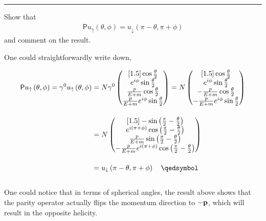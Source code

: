 \noindent\rule{7in}{1.5pt}


\begin{problem}{4.13} 
Show that
\begin{align*}
     \mathsf{P} u_\uparrow \left( \theta,\phi \right) = u_\downarrow \left( \pi-\theta,\pi+\phi \right)
\end{align*}
and comment on the result.
\end{problem}
\begin{solution}
One could straightforwardly write down,

\begin{align*}
    \mathsf{P}u_\uparrow\left(\theta,\phi\right) = \gamma^0 u_\uparrow\left(\theta,\phi\right) &= N \gamma^0 \begin{pmatrix}[1.5] 
        \cos \frac{\theta}{2} \\
        e^{i\phi} \sin \frac{\theta}{2} \\
        \frac{p}{E+m} \cos \frac{\theta}{2} \\
        \frac{p}{E+m} e^{i\phi} \sin \frac{\theta}{2} \\
    \end{pmatrix} = N  \begin{pmatrix}[1.5] 
        \cos \frac{\theta}{2} \\
        e^{i\phi} \sin \frac{\theta}{2} \\
        -\frac{p}{E+m} \cos \frac{\theta}{2} \\
        -\frac{p}{E+m} e^{i\phi} \sin \frac{\theta}{2} \\
    \end{pmatrix} \\[0.15in]
    &= N  \begin{pmatrix}[1.5] 
        - \sin \left(\frac{\pi}{2} - \frac{\theta}{2}\right) \\
        e^{i(\pi+\phi)} \cos \left(\frac{\pi}{2} - \frac{\theta}{2}\right) \\
         \frac{p}{E+m} \sin \left(\frac{\pi}{2} - \frac{\theta}{2}\right) \\
        -\frac{p}{E+m} e^{i(\pi+\phi)} \cos  \left(\frac{\pi}{2} - \frac{\theta}{2}\right) \\
    \end{pmatrix} \\[0.15in]
    &= u_\downarrow \left( \pi-\theta,\pi+\phi\right) \qed
\end{align*}\\
One could notice that in terms of spherical angles, the result above shows that the parity operator actually flips the momentum direction to $-\mathbf{p}$, which will result in the opposite helicity.
\end{solution}

